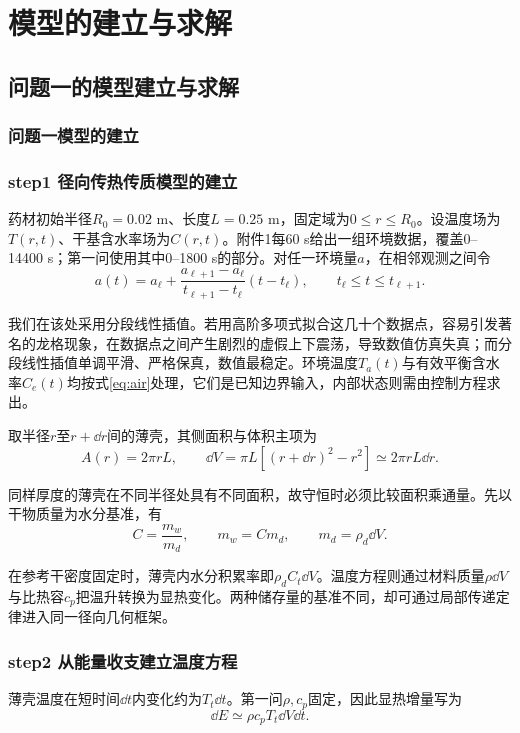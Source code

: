 \section{模型的建立与求解}
\subsection{问题一的模型建立与求解}
\subsubsection{问题一模型的建立}
\subsubsection*{step1 径向传热传质模型的建立}
药材初始半径$R_0=0.02$ m、长度$L=0.25$ m，固定域为$0\le r\le R_0$。设温度场为$T(r,t)$、干基含水率场为$C(r,t)$。附件1每60 s给出一组环境数据，覆盖0--14400 s；第一问使用其中0--1800 s的部分。对任一环境量$a$，在相邻观测之间令
\begin{equation}
a(t)=a_\ell+\frac{a_{\ell+1}-a_\ell}{t_{\ell+1}-t_\ell}(t-t_\ell),
\qquad t_\ell\le t\le t_{\ell+1}.
\label{eq:air}
\end{equation}

我们在该处采用分段线性插值。若用高阶多项式拟合这几十个数据点，容易引发著名的龙格现象，在数据点之间产生剧烈的虚假上下震荡，导致数值仿真失真；而分段线性插值单调平滑、严格保真，数值最稳定。环境温度$T_a(t)$与有效平衡含水率$C_e(t)$均按式\eqref{eq:air}处理，它们是已知边界输入，内部状态则需由控制方程求出。


取半径$r$至$r+\dd r$间的薄壳，其侧面积与体积主项为
\begin{equation}
A(r)=2\pi rL,\qquad
\dd V=\pi L[(r+\dd r)^2-r^2]\simeq2\pi rL\dd r .
\label{eq:shell}
\end{equation}

同样厚度的薄壳在不同半径处具有不同面积，故守恒时必须比较面积乘通量。先以干物质量为水分基准，有
\begin{equation}
C=\frac{m_w}{m_d},\qquad m_w=Cm_d,\qquad
m_d=\rho_d\dd V .
\label{eq:drybasis}
\end{equation}

在参考干密度固定时，薄壳内水分积累率即$\rho_d C_t\dd V$。温度方程则通过材料质量$\rho\dd V$与比热容$c_p$把温升转换为显热变化。两种储存量的基准不同，却可通过局部传递定律进入同一径向几何框架。

\subsubsection*{step2 从能量收支建立温度方程}
薄壳温度在短时间$\dd t$内变化约为$T_t\dd t$。第一问$\rho,c_p$固定，因此显热增量写为
\begin{equation}
\dd E\simeq \rho c_pT_t\dd V\dd t .
\end{equation}

